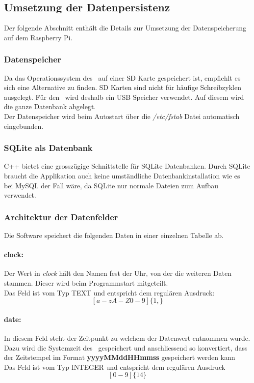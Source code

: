 \subsection{Umsetzung der Datenpersistenz}
    Der folgende Abschnitt enthält die Details zur Umsetzung der Datenspeicherung auf dem Raspberry Pi.
    \subsubsection{Datenspeicher}
    Da das Operationssystem des \rpi\ auf einer SD Karte gespeichert ist, empfiehlt es sich eine Alternative zu finden. SD Karten sind nicht für häufige Schreibzyklen ausgelegt. Für den \documenttitle\ wird deshalb ein USB Speicher verwendet. Auf diesem wird die ganze Datenbank abgelegt.\\
    Der Datenspeicher wird beim Autostart über die \textit{/etc/fstab} Datei automatisch eingebunden.
    
    \subsubsection{SQLite als Datenbank}
    C++ bietet eine grosszügige Schnittstelle für SQLite Datenbanken. Durch SQLite braucht die Applikation auch keine umständliche Datenbankinstallation wie es bei MySQL der Fall wäre, da SQLite nur normale Dateien zum Aufbau verwendet.
    
    \subsubsection{Architektur der Datenfelder}
    Die Software speichert die folgenden Daten in einer einzelnen Tabelle ab.
    \paragraph{clock:}
    Der Wert in \textit{clock} hält den Namen fest der Uhr, von der die weiteren Daten stammen. Dieser wird beim Programmstart mitgeteilt.\\
    Das Feld ist vom Typ TEXT und entspricht dem regulären Ausdruck:
    $$[a-zA-Z0-9]\{1,\}$$
    \paragraph{date:}\label{sec:db_date}
    In diesem Feld steht der Zeitpunkt zu welchem der Datenwert entnommen wurde. Dazu wird die Systemzeit des \rpi\ gespeichert und anschliessend so konvertiert, dass der Zeitstempel im Format \textbf{yyyyMMddHHmmss} gespeichert werden kann\\
    Das Feld ist vom Typ INTEGER und entspricht dem regulären Ausdruck
    $$[0-9]\{14\}$$
